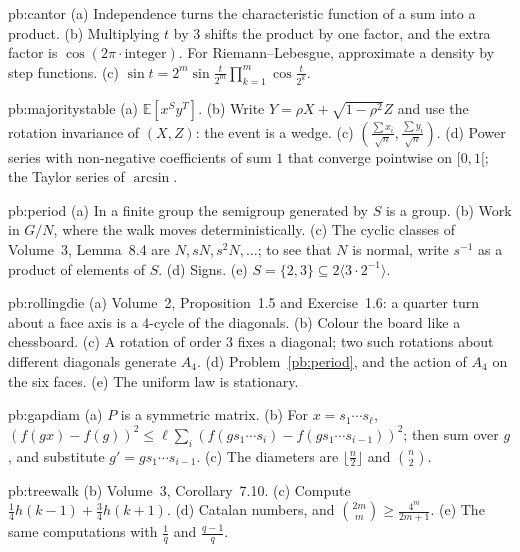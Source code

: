 \begin{hint}{pb:cantor}
(a) Independence turns the characteristic function of a sum into a product. (b) Multiplying $t$ by $3$ shifts the product by one
factor, and the extra factor is $\cos(2\pi\cdot\text{integer})$. For Riemann--Lebesgue, approximate a density by step functions.
(c) $\sin t=2^m\sin\frac t{2^m}\prod_{k=1}^m\cos\frac t{2^k}$.
\end{hint}

\begin{hint}{pb:majoritystable}
(a) $\mathbb E[x^Sy^T]$. (b) Write $Y=\rho X+\sqrt{1-\rho^2}Z$ and use the rotation invariance of $(X,Z)$: the event is a wedge. (c) $(\frac{\sum x_i}{\sqrt n},\frac{\sum y_i}{\sqrt n})$.
(d) Power series with non-negative coefficients of sum $1$ that converge pointwise on $[0,1[$; the Taylor series of $\arcsin$.
\end{hint}

\begin{hint}{pb:period}
(a) In a finite group the semigroup generated by $S$ is a group. (b) Work in $G/N$, where the walk moves deterministically. (c) The cyclic classes of
Volume~3, Lemma~8.4 are $N,sN,s^2N,\dots$; to see that $N$ is normal, write $s^{-1}$ as a product of elements of $S$. (d) Signs. (e) $S=\{2,3\}\subseteq2\langle3\cdot2^{-1}\rangle$.
\end{hint}

\begin{hint}{pb:rollingdie}
(a) Volume~2, Proposition~1.5 and Exercise~1.6: a quarter turn about a face axis is a $4$-cycle of the diagonals. (b) Colour the board like a
chessboard. (c) A rotation of order $3$ fixes a diagonal; two such rotations about different diagonals generate $A_4$. (d) Problem~\ref{pb:period}, and
the action of $A_4$ on the six faces. (e) The uniform law is stationary.
\end{hint}

\begin{hint}{pb:gapdiam}
(a) $P$ is a symmetric matrix. (b) For $x=s_1\cdots s_\ell$, $(f(gx)-f(g))^2\le\ell\sum_i(f(gs_1\cdots s_i)-f(gs_1\cdots s_{i-1}))^2$; then sum over $g$, and substitute $g'=gs_1\cdots s_{i-1}$.
(c) The diameters are $\lfloor\frac n2\rfloor$ and $\binom n2$.
\end{hint}

\begin{hint}{pb:treewalk}
(b) Volume~3, Corollary~7.10. (c) Compute $\frac14h(k-1)+\frac34h(k+1)$. (d) Catalan numbers, and $\binom{2m}m\ge\frac{4^m}{2m+1}$. (e) The same computations with $\frac1q$ and $\frac{q-1}q$.
\end{hint}

